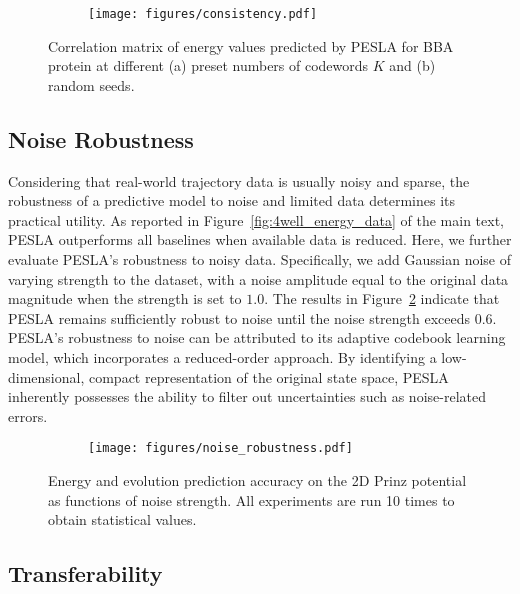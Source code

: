 \begin{figure}[!ht]
    \centering
    \begin{subfigure}[b]{\textwidth} %
        \centering
        \texttt{[image: figures/consistency.pdf]}
    \end{subfigure}

    \caption{Correlation matrix of energy values predicted by PESLA for BBA protein at different (a) preset numbers of codewords $K$ and (b) random seeds.}
    \label{fig:consistency}
\end{figure}


\subsection{Noise Robustness}

Considering that real-world trajectory data is usually noisy and sparse, the robustness of a predictive model to noise and limited data determines its practical utility. As reported in Figure~\ref{fig:4well_energy_data} of the main text, PESLA outperforms all baselines when available data is reduced. Here, we further evaluate PESLA’s robustness to noisy data. Specifically, we add Gaussian noise of varying strength to the dataset, with a noise amplitude equal to the original data magnitude when the strength is set to $1.0$. The results in Figure~\ref{fig:noise_robustness} indicate that PESLA remains sufficiently robust to noise until the noise strength exceeds 0.6. PESLA’s robustness to noise can be attributed to its adaptive codebook learning model, which incorporates a reduced-order approach. By identifying a low-dimensional, compact representation of the original state space, PESLA inherently possesses the ability to filter out uncertainties such as noise-related errors.

\begin{figure}[!ht]
    \centering
    \begin{subfigure}[b]{0.9\textwidth} %
        \centering
        \texttt{[image: figures/noise\_robustness.pdf]}
    \end{subfigure}

    \caption{Energy and evolution prediction accuracy on the 2D Prinz potential as functions of noise strength. All experiments are run 10 times to obtain statistical values.}
    \label{fig:noise_robustness}
\end{figure}


\subsection{Transferability}

